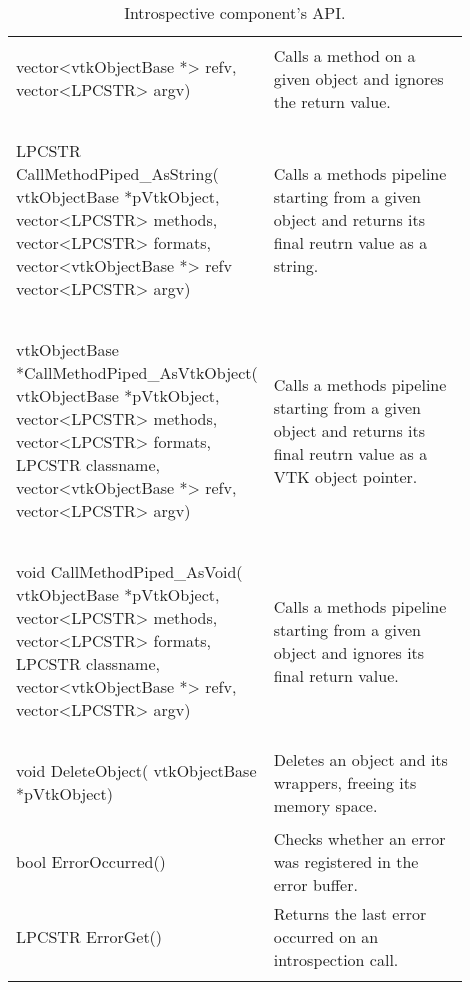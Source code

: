 \begin{appendices}
\begin{landscape}
\begin{longtable}[c]{
			>{\raggedright\arraybackslash}p{0.4\linewidth}
			>{\raggedright\arraybackslash}p{0.5\linewidth}
		}
\begin{codify}
		vector<vtkObjectBase *> refv,
		vector<LPCSTR> argv)
	\end{codify} &
	Calls a method on a given object and ignores the return value.
	\\
	\begin{codify}
	LPCSTR CallMethodPiped_AsString(
		vtkObjectBase *pVtkObject,
		vector<LPCSTR> methods,
		vector<LPCSTR> formats,
		vector<vtkObjectBase *> refv
		vector<LPCSTR> argv)
	\end{codify} &
	Calls a methods pipeline starting from a given object and returns its final reutrn value as a string.
	\\
	\begin{codify}
	vtkObjectBase *CallMethodPiped_AsVtkObject(
		vtkObjectBase *pVtkObject,
		vector<LPCSTR> methods,
		vector<LPCSTR> formats,
		LPCSTR classname,
		vector<vtkObjectBase *> refv,
		vector<LPCSTR> argv)
	\end{codify} &
	Calls a methods pipeline starting from a given object and returns its final reutrn value as a VTK object pointer.
	\\
	\begin{codify}
	void CallMethodPiped_AsVoid(
		vtkObjectBase *pVtkObject,
		vector<LPCSTR> methods,
		vector<LPCSTR> formats,
		LPCSTR classname,
		vector<vtkObjectBase *> refv,
		vector<LPCSTR> argv)
	\end{codify} &
	Calls a methods pipeline starting from a given object and ignores its final return value.
	\\
	\begin{codify}
	void DeleteObject(
		vtkObjectBase *pVtkObject)
	\end{codify} &
	Deletes an object and its wrappers, freeing its memory space.
	\\
	\begin{codify}
	bool ErrorOccurred()
	\end{codify} &
	Checks whether an error was registered in the error buffer.
	\\
	\begin{codify}
	LPCSTR ErrorGet()
	\end{codify} &
	Returns the last error occurred on an introspection call.
	\\
	\caption{Introspective component's API.}
	\label{tab:introspective-api}\\
	\end{longtable}
\end{landscape}

\end{appendices}